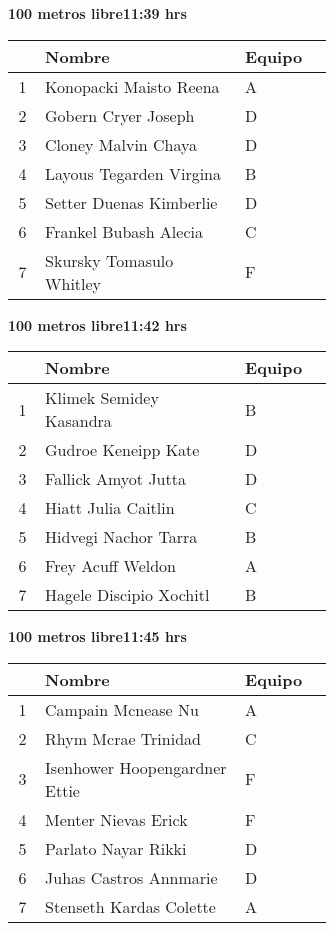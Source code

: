\begin{minipage}{0.95\linewidth}
\begin{center}
\textbf{
100 metros libre\hspace{1cm}11:39 hrs}
\end{center}
\begin{tabular}{cp{0.63\linewidth}l}
\hline
& \textbf{Nombre} & \textbf{Equipo} \\ \hline
1 & Konopacki Maisto Reena & A \\ 
2 & Gobern Cryer Joseph & D \\ 
3 & Cloney Malvin Chaya & D \\ 
4 & Layous Tegarden Virgina & B \\ 
5 & Setter Duenas Kimberlie & D \\ 
6 & Frankel Bubash Alecia & C \\ 
7 & Skursky Tomasulo Whitley & F \\ 
\end{tabular}
\end{minipage}
\begin{minipage}{0.95\linewidth}
\begin{center}
\textbf{
100 metros libre\hspace{1cm}11:42 hrs}
\end{center}
\begin{tabular}{cp{0.63\linewidth}l}
\hline
& \textbf{Nombre} & \textbf{Equipo} \\ \hline
1 & Klimek Semidey Kasandra & B \\ 
2 & Gudroe Keneipp Kate & D \\ 
3 & Fallick Amyot Jutta & D \\ 
4 & Hiatt Julia Caitlin & C \\ 
5 & Hidvegi Nachor Tarra & B \\ 
6 & Frey Acuff Weldon & A \\ 
7 & Hagele Discipio Xochitl & B \\ 
\end{tabular}
\end{minipage}
\begin{minipage}{0.95\linewidth}
\begin{center}
\textbf{
100 metros libre\hspace{1cm}11:45 hrs}
\end{center}
\begin{tabular}{cp{0.63\linewidth}l}
\hline
& \textbf{Nombre} & \textbf{Equipo} \\ \hline
1 & Campain Mcnease Nu & A \\ 
2 & Rhym Mcrae Trinidad & C \\ 
3 & Isenhower Hoopengardner Ettie & F \\ 
4 & Menter Nievas Erick & F \\ 
5 & Parlato Nayar Rikki & D \\ 
6 & Juhas Castros Annmarie & D \\ 
7 & Stenseth Kardas Colette & A \\ 
\end{tabular}
\end{minipage}
